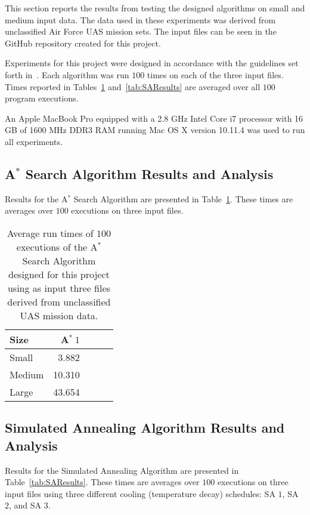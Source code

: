 \documentclass[conference]{IEEEtran}
\begin{document}
This section reports the results from testing the designed algorithms on small
and medium input data. The data used in these experiments was derived from
unclassified Air Force UAS mission sets. The input files can be seen in the
GitHub repository created for this project.

Experiments for this project were designed in accordance with the guidelines
set forth in~\cite{barr2001}. Each algorithm was run $100$ times on each of the
three input files. Times reported in Tables~\ref{tab:astarResults}
and~\ref{tab:SAResults} are averaged over all $100$ program executions.

An Apple MacBook Pro equipped with a 2.8 GHz Intel Core i7 processor with 16 GB
of 1600 MHz DDR3 RAM running Mac OS X version 10.11.4 was used to run all
experiments.
 
\subsection{A$^*$ Search Algorithm Results and Analysis}

Results for the A$^*$ Search Algorithm are presented in
Table~\ref{tab:astarResults}. These times are averages over $100$ executions on
three input files.

\begin{table}[ht!]
  \centering
  \caption{Average run times of $100$ executions of the A$^*$ Search Algorithm
  designed for this project using as input three files derived from
  unclassified UAS mission data.}
  \label{tab:astarResults}
  \begin{tabular}{ | l | r | r | r | r | }
  \hline
    Size     & A$^*\ 1$ \\ \hline\hline
    Small    &    3.882 \\ \hline
    Medium   &   10.310 \\ \hline
    Large    &   43.654 \\ \hline
  \end{tabular}
\end{table}

\subsection{Simulated Annealing Algorithm Results and Analysis}
 
Results for the Simulated Annealing Algorithm are presented in
Table~\ref{tab:SAResults}. These times are averages over $100$ executions on
three input files using three different cooling (temperature decay) schedules:
SA $1$, SA $2$, and SA $3$.
\end{document}
